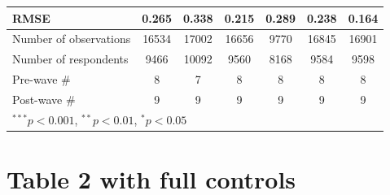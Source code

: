 \documentclass[12pt, letter]{article}
\begin{document}
\begin{table}
\begin{center}
{\begin{tabular}{l c c c c c c}
RMSE                             & 0.265          & 0.338          & 0.215          & 0.289          & 0.238          & 0.164          \\
\hline
Number of observations           & 16534          & 17002          & 16656          & 9770           & 16845          & 16901          \\
Number of respondents & 9466 & 10092 & 9560 & 8168 & 9584 & 9598 \\ 
Pre-wave \# & 8 & 7 & 8 & 8 & 8 & 8 \\ 
Post-wave \# & 9 & 9 & 9 & 9 & 9 & 9 \\  
\toprule[1.5pt]
\multicolumn{7}{l}{\scriptsize{$^{***}p<0.001$, $^{**}p<0.01$, $^*p<0.05$}}
\end{tabular}}
\end{center}
\end{table}

\section{Table 2 with full controls} \label{appendixtable2}
\end{document}
